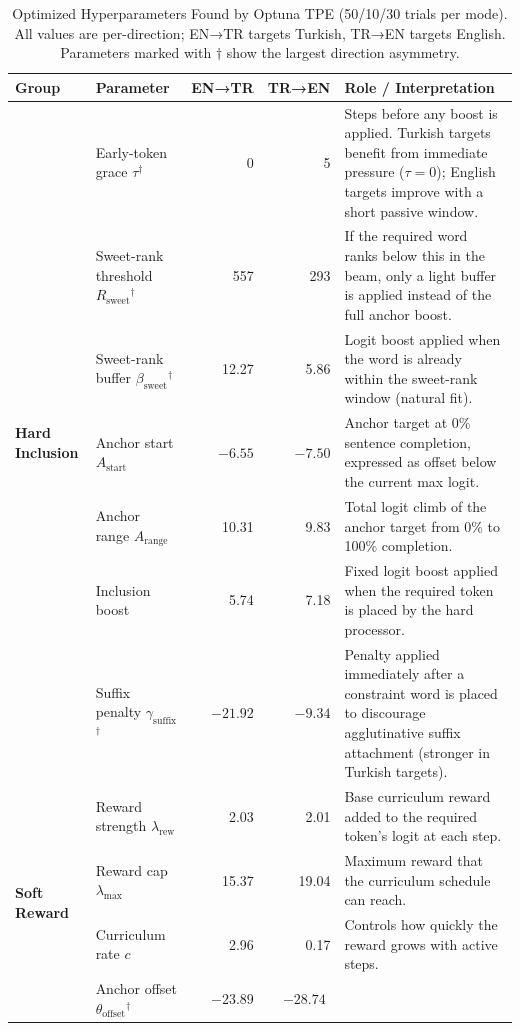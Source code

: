 \documentclass[conference]{IEEEtran}
\begin{document}
\begin{table}[!t]
\caption{Optimized Hyperparameters Found by Optuna TPE (50/10/30 trials per mode). All values are per-direction; EN→TR targets Turkish, TR→EN targets English. Parameters marked with $\dagger$ show the largest direction asymmetry.}
\label{tab:hpo_params}
\centering
\begin{tabular}{llrrp{5.8cm}}
\toprule
Group & Parameter & EN→TR & TR→EN & Role / Interpretation \\
\midrule
\multirow{7}{*}{\textbf{Hard Inclusion}}
  & Early-token grace $\tau$$^\dagger$ & 0 & 5
    & Steps before any boost is applied. Turkish targets benefit from immediate pressure ($\tau{=}0$); English targets improve with a short passive window. \\
  & Sweet-rank threshold $R_{\text{sweet}}$$^\dagger$ & 557 & 293
    & If the required word ranks below this in the beam, only a light buffer is applied instead of the full anchor boost. \\
  & Sweet-rank buffer $\beta_{\text{sweet}}$$^\dagger$ & 12.27 & 5.86
    & Logit boost applied when the word is already within the sweet-rank window (natural fit). \\
  & Anchor start $A_{\text{start}}$ & $-6.55$ & $-7.50$
    & Anchor target at 0\% sentence completion, expressed as offset below the current max logit. \\
  & Anchor range $A_{\text{range}}$ & 10.31 & 9.83
    & Total logit climb of the anchor target from 0\% to 100\% completion. \\
  & Inclusion boost & 5.74 & 7.18
    & Fixed logit boost applied when the required token is placed by the hard processor. \\
  & Suffix penalty $\gamma_{\text{suffix}}$$^\dagger$ & $-21.92$ & $-9.34$
    & Penalty applied immediately after a constraint word is placed to discourage agglutinative suffix attachment (stronger in Turkish targets). \\
\midrule
\multirow{4}{*}{\textbf{Soft Reward}}
  & Reward strength $\lambda_{\text{rew}}$ & 2.03 & 2.01
    & Base curriculum reward added to the required token's logit at each step. \\
  & Reward cap $\lambda_{\text{max}}$ & 15.37 & 19.04
    & Maximum reward that the curriculum schedule can reach. \\
  & Curriculum rate $c$ & 2.96 & 0.17
    & Controls how quickly the reward grows with active steps. \\
  & Anchor offset $\theta_{\text{offset}}$$^\dagger$ & $-23.89$ & $-28.74$
$$
\end{tabular}
\end{table}
\end{document}
